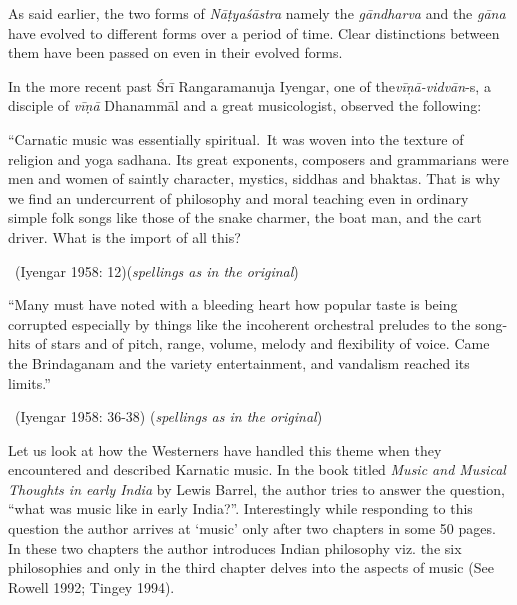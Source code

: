 As said earlier, the two forms of \textit{Nāṭyaśāstra} namely the \textit{gāndharva} and the \textit{gāna} have evolved to different forms over a period of time. Clear distinctions between them have been passed on even in their evolved forms.

In the more recent past Śrī Rangaramanuja Iyengar, one of the\break \textit{vīṇā-vidvān}-s, a disciple of \textit{vīṇā} Dhanammāl and a great musicologist, observed the following:

\begin{myquote}
“Carnatic music was essentially spiritual.~It was woven into the texture of religion and yoga sadhana. Its great exponents, composers and grammarians were men and women of saintly character, mystics, siddhas and bhaktas. That is why we find an undercurrent of philosophy and moral teaching even in ordinary simple folk songs like those of the snake charmer, the boat man, and the cart driver. What is the import of all this? 

~\hfill (Iyengar 1958: 12)(\textit{spellings as in the original})
\end{myquote}

\vspace{.1cm}

\begin{myquote}
“Many must have noted with a bleeding heart how popular taste is being corrupted especially by things like the incoherent orchestral preludes to the song-hits of stars and of pitch, range, volume, melody and flexibility of voice. Came the Brindaganam and the variety entertainment, and vandalism reached its limits.” 

~\hfill (Iyengar 1958: 36-38) (\textit{spellings as in the original})
\end{myquote}

Let us look at how the Westerners have handled this theme when they encountered and described Karnatic music. In the book titled \textit{Music and Musical Thoughts in early India} by Lewis Barrel, the author tries to answer the question, “what was music like in early India?”. Interestingly while responding to this question the author arrives at ‘music’ only after two chapters in some 50 pages. In these two chapters the author introduces Indian philosophy viz. the six philosophies and only in the third chapter delves into the aspects of music (See Rowell 1992; Tingey 1994).

